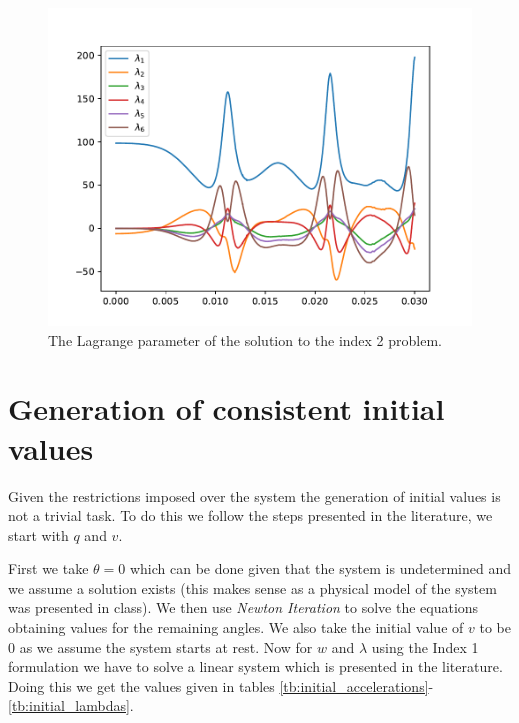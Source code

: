 \documentclass{report}
\begin{document}
\begin{figure}[h]
\centering
\begin{minipage}[b]{0.45\textwidth}
\centering
\includegraphics[width=\textwidth]{../Plots/Project2_main/Figure_512}
\caption{The Lagrange parameter of the solution to the index 2 problem.}
\label{pl:indx3_soln_lambdas}
\end{minipage}
\end{figure}

\section*{Generation of consistent initial values}

Given the restrictions imposed over the system the generation of initial values is not a trivial task. To do this we follow the steps presented in the literature, we start with $q$ and $v$.

First we take $\theta=0$ which can be done given that the system is undetermined and we assume a solution exists (this makes sense as a physical model of the system was presented in class). We then use \textit{Newton Iteration} to solve the equations obtaining values for the remaining angles.
We also take the initial value of $v$ to be $0$ as we assume the system starts at rest. Now for $w$ and $\lambda$ using the Index 1 formulation we have to solve a linear system which is presented in the literature. Doing this we get the values given in tables \ref{tb:initial_accelerations}-\ref{tb:initial_lambdas}.
\end{document}
